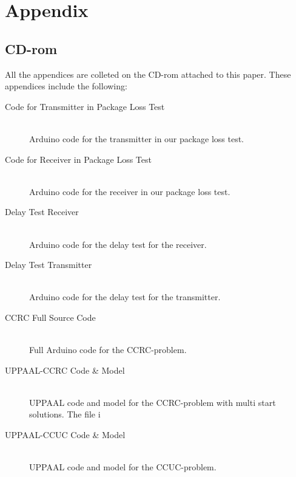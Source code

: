 \appendix
\part{Appendix}

\chapter{CD-rom}\label{cdrom}
All the appendices are colleted on the CD-rom attached to this paper.
These appendices include the following: 

\begin{description}
\item[Code for Transmitter in Package Loss Test\label{app:PkgLossTxCode}]\hfill\\
    Arduino code for the transmitter in our package loss test.
%
    
\item[Code for Receiver in Package Loss Test\label{app:PkgLossRxCode}]\hfill\\
    Arduino code for the receiver in our package loss test.
    
\item[Delay Test Receiver\label{app:t2receiver}]\hfill\\
    Arduino code for the delay test for the receiver.
    
\item[Delay Test Transmitter\label{app:t2transmitter}]\hfill\\
    Arduino code for the delay test for the transmitter.

\item[CCRC Full Source Code \label{app:CCRC_CODE}]\hfill\\
    Full Arduino code for the CCRC-problem.
    
\item[UPPAAL-CCRC Code & Model\label{UPPAAL-CCRC-Code}]\hfill\\
    UPPAAL code and model for the CCRC-problem with multi start solutions. The file i 
    
\item[UPPAAL-CCUC Code & Model\label{UPPAAL-CCUC-Code}]\hfill\\
    UPPAAL code and model for the CCUC-problem.
\end{description}